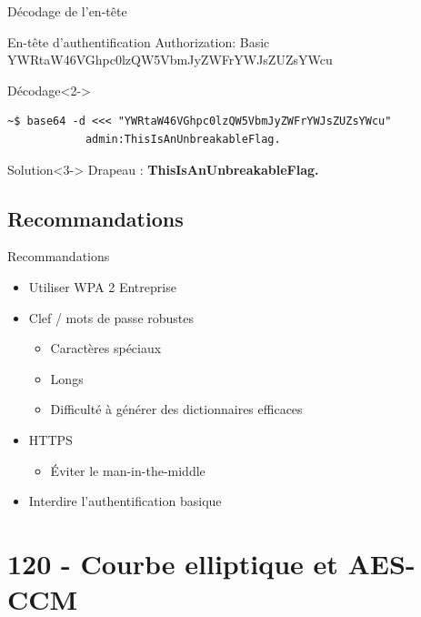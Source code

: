 \documentclass[10pt,sans,usenames,dvipsnames,french,compress]{beamer}
\begin{document}
\begin{frame}[fragile]{Décodage de l'en-tête}
	\begin{block}{En-tête d'authentification}
		Authorization: Basic YWRtaW46VGhpc0lzQW5VbmJyZWFrYWJsZUZsYWcu
	\end{block}

	\begin{block}{Décodage}<2->
		\vspace{-3mm}
		\begin{lstlisting}[style=Term]
			~$ base64 -d <<< "YWRtaW46VGhpc0lzQW5VbmJyZWFrYWJsZUZsYWcu"
			admin:ThisIsAnUnbreakableFlag.
		\end{lstlisting}
		\vspace{-2mm}
	\end{block}

	\begin{exampleblock}{Solution}<3->
		Drapeau : \textbf{ThisIsAnUnbreakableFlag.}
	\end{exampleblock}
\end{frame}

\subsection{Recommandations}
\begin{frame}{Recommandations}
	\begin{itemize}
		\item<2-> Utiliser WPA 2 Entreprise
		\item<3-> Clef / mots de passe robustes
		\begin{itemize}
			\item<4-> Caractères spéciaux
			\item<5-> Longs
			\item<6-> Difficulté à générer des dictionnaires efficaces
		\end{itemize}
		\item<7-> HTTPS
		\begin{itemize}
			\item<7-> Éviter le man-in-the-middle
		\end{itemize}
		\item<8-> Interdire l'authentification basique
	\end{itemize}
\end{frame}

\section{120 - Courbe elliptique et AES-CCM}
\end{document}
